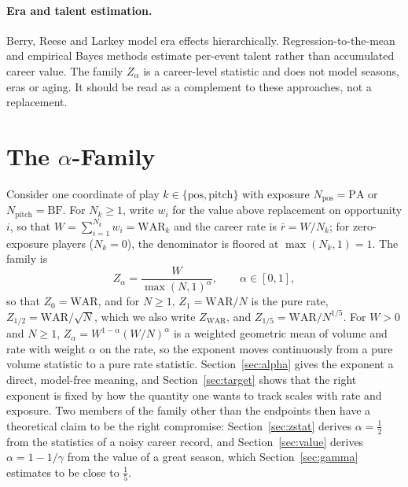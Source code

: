 \documentclass[11pt,letterpaper]{article}
\theoremstyle{plain}
\theoremstyle{definition}
\theoremstyle{remark}
\newcommand{\WAR}{\mathrm{WAR}}
\newcommand{\PA}{\mathrm{PA}}
\newcommand{\BF}{\mathrm{BF}}
\newcommand{\ZWAR}{Z_{\WAR}}
\begin{document}
\paragraph{Era and talent estimation.} Berry, Reese and Larkey \cite{berry1999} model era effects hierarchically. Regression-to-the-mean and empirical Bayes methods \cite{efron1975,tango2007,albert2017,albert2020} estimate per-event talent rather than accumulated career value. The family $Z_\alpha$ is a career-level statistic and does not model seasons, eras or aging. It should be read as a complement to these approaches, not a replacement.

\section{The \texorpdfstring{$\alpha$}{alpha}-Family}
\label{sec:theory}

Consider one coordinate of play $k \in \{\mathrm{pos}, \mathrm{pitch}\}$ with exposure $N_{\mathrm{pos}} = \PA$ or $N_{\mathrm{pitch}} = \BF$. For $N_k \ge 1$, write $w_i$ for the value above replacement on opportunity $i$, so that $W = \sum_{i=1}^{N_k} w_i = \WAR_k$ and the career rate is $\bar r = W/N_k$; for zero-exposure players ($N_k = 0$), the denominator is floored at $\max(N_k, 1) = 1$. The family is
\begin{equation}
    Z_\alpha = \frac{W}{\max(N, 1)^{\alpha}}, \qquad \alpha \in [0,1],
    \label{eq:family}
\end{equation}
so that $Z_0 = \WAR$, and for $N \ge 1$, $Z_1 = \WAR/N$ is the pure rate, $Z_{1/2} = \WAR/\sqrt N$, which we also write $\ZWAR$, and $Z_{1/5} = \WAR/N^{1/5}$. For $W > 0$ and $N \ge 1$, $Z_\alpha = W^{1-\alpha}(W/N)^{\alpha}$ is a weighted geometric mean of volume and rate with weight $\alpha$ on the rate, so the exponent moves continuously from a pure volume statistic to a pure rate statistic. Section~\ref{sec:alpha} gives the exponent a direct, model-free meaning, and Section~\ref{sec:target} shows that the right exponent is fixed by how the quantity one wants to track scales with rate and exposure. Two members of the family other than the endpoints then have a theoretical claim to be the right compromise: Section~\ref{sec:zstat} derives $\alpha = \tfrac12$ from the statistics of a noisy career record, and Section~\ref{sec:value} derives $\alpha = 1 - 1/\gamma$ from the value of a great season, which Section~\ref{sec:gamma} estimates to be close to $\tfrac15$.
\end{document}
